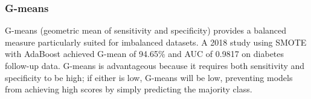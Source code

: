 \subsubsection{G-means}

G-means (geometric mean of sensitivity and specificity) provides a balanced measure particularly suited for imbalanced datasets. A 2018 study using SMOTE with AdaBoost achieved G-mean of 94.65\% and AUC of 0.9817 on diabetes follow-up data. G-means is advantageous because it requires both sensitivity and specificity to be high; if either is low, G-means will be low, preventing models from achieving high scores by simply predicting the majority class.
